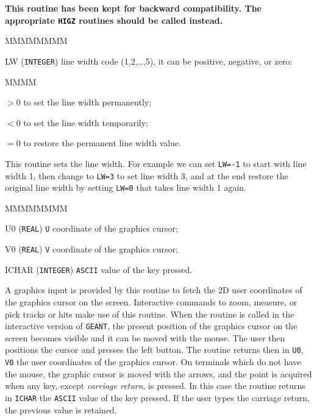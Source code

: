 
{\bf This routine has been kept for backward compatibility. The appropriate
{\tt HIGZ} routines should be called instead.}

\begin{DLtt}{MMMMMMMM}
\item[ LW] ({\tt INTEGER}) line width code (1,2,\ldots,5), it can be positive, 
negative, or zero:
\begin{DLtt}{MMMM}
\item[$>$0] to set the line width permanently;
\item[$<$0] to set the line width temporarily;
\item[$=$0] to restore the permanent line width value.
\end{DLtt}
\end{DLtt}
This routine sets the line width.
For example we can set {\tt LW=-1} to start with line width  1,
then change to {\tt LW=3} to set line width 3, and at the end
restore the original line width by setting {\tt LW=0} that
takes line width  1 again.

\begin{DLtt}{MMMMMMMM}
\item[U0]   ({\tt REAL}) {\tt U} coordinate of the graphics cursor;
\item[V0]   ({\tt REAL}) {\tt V} coordinate of the graphics cursor;
\item[ICHAR] ({\tt INTEGER}) {\tt ASCII} value of the key pressed.
\end{DLtt}
A graphics input is provided by this routine to fetch the 2D user coordinates
of the graphics cursor on the screen.
Interactive commands to zoom, 
measure, or pick tracks or hits make use of this routine.
When the routine is called in the interactive
version of {\tt GEANT},
the present position of the graphics cursor on the screen becomes visible and
it can be moved with the mouse. The user then positions the 
cursor and presses the left button. 
The routine returns then in {\tt U0}, {\tt V0} the user coordinates
of the graphics cursor.
On terminals which do not have the mouse, the graphic cursor is moved
with the arrows, and the point is acquired when any key, except {\it carriage
return}, is pressed. In this case the routine returns in {\tt ICHAR} the 
{\tt ASCII} value of the key pressed. If the user types the carriage return, 
the previous value is retained.


